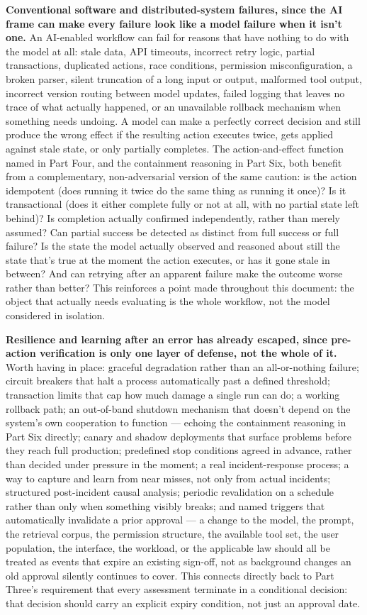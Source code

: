 \textbf{Conventional software and distributed-system failures, since the AI frame can make every failure look like a model failure when it isn't one.} An AI-enabled workflow can fail for reasons that have nothing to do with the model at all: stale data, API timeouts, incorrect retry logic, partial transactions, duplicated actions, race conditions, permission misconfiguration, a broken parser, silent truncation of a long input or output, malformed tool output, incorrect version routing between model updates, failed logging that leaves no trace of what actually happened, or an unavailable rollback mechanism when something needs undoing. A model can make a perfectly correct decision and still produce the wrong effect if the resulting action executes twice, gets applied against stale state, or only partially completes. The action-and-effect function named in Part Four, and the containment reasoning in Part Six, both benefit from a complementary, non-adversarial version of the same caution: is the action idempotent (does running it twice do the same thing as running it once)? Is it transactional (does it either complete fully or not at all, with no partial state left behind)? Is completion actually confirmed independently, rather than merely assumed? Can partial success be detected as distinct from full success or full failure? Is the state the model actually observed and reasoned about still the state that's true at the moment the action executes, or has it gone stale in between? And can retrying after an apparent failure make the outcome worse rather than better? This reinforces a point made throughout this document: the object that actually needs evaluating is the whole workflow, not the model considered in isolation.

\textbf{Resilience and learning after an error has already escaped, since pre-action verification is only one layer of defense, not the whole of it.} Worth having in place: graceful degradation rather than an all-or-nothing failure; circuit breakers that halt a process automatically past a defined threshold; transaction limits that cap how much damage a single run can do; a working rollback path; an out-of-band shutdown mechanism that doesn't depend on the system's own cooperation to function --- echoing the containment reasoning in Part Six directly; canary and shadow deployments that surface problems before they reach full production; predefined stop conditions agreed in advance, rather than decided under pressure in the moment; a real incident-response process; a way to capture and learn from near misses, not only from actual incidents; structured post-incident causal analysis; periodic revalidation on a schedule rather than only when something visibly breaks; and named triggers that automatically invalidate a prior approval --- a change to the model, the prompt, the retrieval corpus, the permission structure, the available tool set, the user population, the interface, the workload, or the applicable law should all be treated as events that expire an existing sign-off, not as background changes an old approval silently continues to cover. This connects directly back to Part Three's requirement that every assessment terminate in a conditional decision: that decision should carry an explicit expiry condition, not just an approval date.

